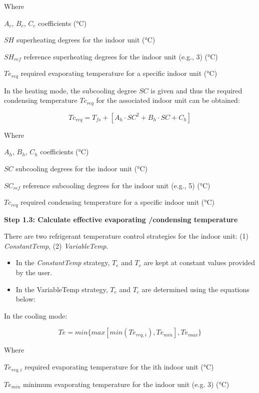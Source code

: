 Where

$A_c$, $B_c$, $C_c$ coefficients (°C)

$SH$ superheating degrees for the indoor unit (°C) 

$SH_{ref}$ reference superheating degrees for the indoor unit (e.g., 3) (°C)

$Te_{req}$ required evaporating temperature for a specific indoor unit (°C)

In the heating mode, the subcooling degree $SC$ is given and thus the required condensing temperature $Tc_{req}$ for the associated indoor unit can be obtained:

\begin{equation}
  Tc_{req}=T_{fs}+[A_h\cdot SC^2+B_h\cdot SC+C_h]
\end{equation}
 
Where

$A_h$, $B_h$, $C_h$ coefficients (°C)

$SC$ subcooling degrees for the indoor unit (°C) 

$SC_{ref}$ reference subcooling degrees for the indoor unit (e.g., 5) (°C)

$Tc_{req}$ required condensing temperature for a specific indoor unit (°C)

\textbf{Step 1.3: Calculate effective evaporating /condensing temperature}

There are two refrigerant temperature control strategies for the indoor unit: (1) \emph{ConstantTemp}, (2) \emph{VariableTemp}.

\begin{itemize}
  \item
    In the \emph{ConstantTemp} strategy, $T_e$ and $T_c$ are kept at constant values provided by the user.

 \item
   In the {VariableTemp} strategy, $T_e$ and $T_c$ are determined using the equations below:
\end{itemize}

In the cooling mode:

\begin{equation}
  Te = min \{ max [ min(Te_{req,i}), Te_{min}], Te_{max}\}
\end{equation}
 
Where

$Te_{req,i}$ required evaporating temperature for the ith indoor unit (°C)

$Te_{min}$ minimum evaporating temperature for the indoor unit (e.g. 3) (°C)


